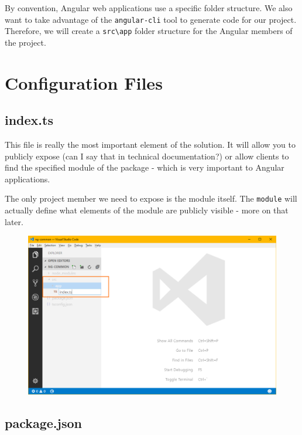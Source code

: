 \documentclass[]{book}
\theoremstyle{definition}
\theoremstyle{definition}
\theoremstyle{definition}
\theoremstyle{remark}
\begin{document}
By convention, Angular web applications use a specific folder structure.
We also want to take advantage of the \texttt{angular-cli} tool to
generate code for our project. Therefore, we will create a
\texttt{src\textbackslash{}app} folder structure for the Angular members
of the project.

\section{Configuration Files}\label{configuration-files}

\subsection{index.ts}\label{index.ts}

This file is really the most important element of the solution. It will
allow you to publicly expose (can I say that in technical
documentation?) or allow clients to find the specified module of the
package - which is very important to Angular applications.

The only project member we need to expose is the module itself. The
\texttt{module} will actually define what elements of the module are
publicly visible - more on that later.

\begin{figure}
\centering
\includegraphics{images/create-index-file.png}
\caption{}
\end{figure}

\subsection{package.json}\label{package.json}
\end{document}
